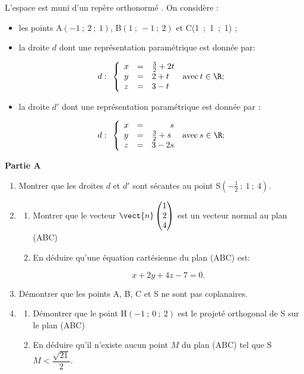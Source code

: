 \medskip

L'espace est muni d'un repère orthonormé \Oijk. On considère :

\begin{itemize}[label=$\bullet~$]
\item les points A$(-1~;~2~;~1)$, \:B$(1~;~-1~;~2)$ et C(1~;~1~;~1) ;
\item la droite $d$ dont une représentation paramétrique est donnée par:

\[d : \:\: \left\{\begin{array}{l c l}
x& =& \frac 32 + 2t\\
y&=&2 +t\\
z&=&3 - t 
\end{array}\right. \:\text{avec}\: t \in\R ;\]
\item la droite $d'$ dont une représentation paramétrique est donnée par :

\[d : \:\: \left\{\begin{array}{l c l}
x& =&\phantom{3 - 2}s\\
y&=&\frac 32 + s\\
z&=&3 - 2s 
\end{array}\right. \:\text{avec}\: s \in\R ;\]
\end{itemize}

\medskip

\begin{center}\textbf{Partie A} \end{center}

\smallskip

\begin{enumerate}
\item Montrer que les droites $d$ et $d'$ sont sécantes au point S$\left(- \frac 12~;~1~;~4\right)$.
\item 
	\begin{enumerate}
		\item Montrer que le vecteur $\vect{n}\begin{pmatrix} 1\\2\\4\end{pmatrix}$ est un vecteur normal au plan (ABC) 
		\item En déduire qu'une équation cartésienne du plan (ABC) est:

\[x + 2y + 4z - 7 = 0.\]
	\end{enumerate}
\item Démontrer que les points A, B, C et S ne sont pas coplanaires.
\item 
	\begin{enumerate}
		\item Démontrer que le point H$(-1~;~0~;~2)$ est le projeté orthogonal de S sur le plan (ABC)
		\item En déduire qu'il n'existe aucun point $M$ du plan (ABC) tel que S$M < \dfrac{\sqrt{21}}{2}$.
	\end{enumerate}
\end{enumerate}

